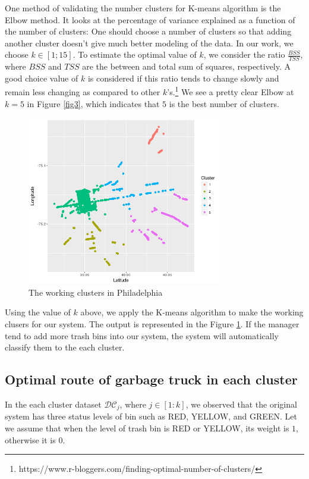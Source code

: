 \documentclass[conference,compsoc]{IEEEtran}
\begin{document}
 One method of validating the number clusters for K-means algorithm is the Elbow method. It looks at the percentage of variance explained as a function of the number of clusters: One should choose a number of clusters so that adding another cluster doesn’t give much better modeling of the data. In our work, we choose $k \in [1;15]$. To estimate the optimal value of $k$, we consider the ratio $\frac{BSS}{TSS}$, where $BSS$ and $TSS$ are the between and total sum of squares, respectively. A good choice value of $k$ is considered if this ratio tends to change slowly and remain less changing as compared to other $k$'s.\footnote{https://www.r-bloggers.com/finding-optimal-number-of-clusters/} We see a pretty clear Elbow at $k = 5$ in Figure \ref{fig3}, which indicates that $5$ is the best number of clusters.
   \begin{figure}
 	\centering
 	\includegraphics[width=8.5cm]{workingcluster}
 	\caption{The working clusters in Philadelphia}
 	\label{fig4}
 \end{figure}
 
 \par Using the value of $k$ above, we apply the K-means algorithm to make the working clusers for our system. The output is represented in the Figure \ref{fig4}. If the manager tend to add more trash bins into our system, the system will automatically classify them to the each cluster. 
 

 
\subsection{Optimal route of garbage truck in each cluster}


In the each cluster dataset $\mathcal{DC}_j$, where $j \in [1:k]$, we observed that the original system has three status levels of bin such as RED, YELLOW, and GREEN. Let we assume that when the level of trash bin is RED or YELLOW, its weight is $1$, otherwise it is $0$.
\end{document}
